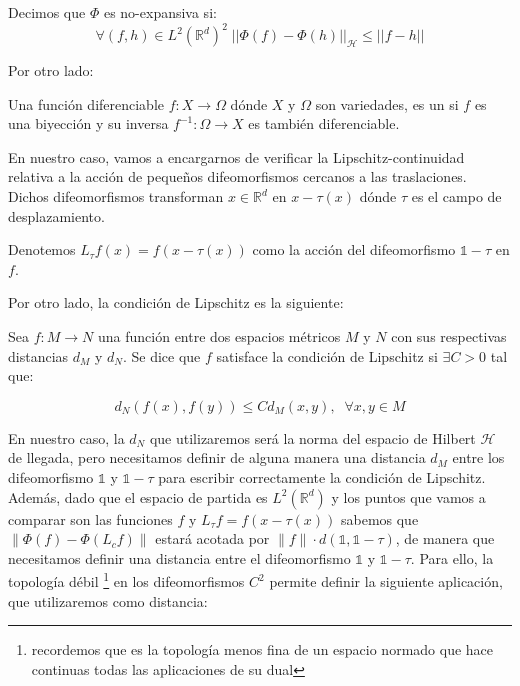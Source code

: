 \begin{definicion}
Decimos que $\Phi$ es no-expansiva si: 
$$\forall (f,h) \in L^2(\mathbb{R}^d)^2 \; || \Phi(f)-\Phi(h)||_\mathcal{H} \leq ||f-h||$$
\end{definicion}

\noindent Por otro lado: 


\begin{definicion}
  Una función diferenciable $f: X \rightarrow \Omega$ dónde $X$ y $\Omega$ son variedades, es un  si $f$ es una biyección y su inversa $f^{-1}:\Omega \rightarrow X$ es también diferenciable. 
\end{definicion}


\noindent En nuestro caso, vamos a encargarnos de verificar la Lipschitz-continuidad relativa a la acción de pequeños difeomorfismos cercanos a las traslaciones. Dichos difeomorfismos transforman $x \in \mathbb{R}^d$ en $x-\tau (x)$ dónde $\tau$ es el campo de desplazamiento. 

\begin{definicion}
Denotemos $L_{\tau} f(x)=f(x-\tau(x))$ como la acción del difeomorfismo $\mathbb{1}-\tau$ en $f$.
\end{definicion} 

\medskip

\noindent Por otro lado, la condición de Lipschitz es la siguiente: 

\begin{definicion}
  Sea $f: M \rightarrow N$ una función entre dos espacios métricos $M$ y $N$ con sus respectivas distancias $d_M$ y $d_N$. Se dice que $f$ satisface la condición de Lipschitz si $\exists C>0$ tal que: 

  $$d_N(f(x),f(y))\leq C d_M(x,y), \; \; \forall x,y \in M$$
\end{definicion}

\noindent En nuestro caso, la $d_N$ que utilizaremos será la norma del espacio de Hilbert $\mathcal{H}$ de llegada, pero necesitamos definir de alguna manera una distancia $d_M$ entre los difeomorfismo $\mathbb{1}$ y $\mathbb{1}-\tau$ para escribir correctamente la condición de Lipschitz. Además, dado que el espacio de partida es $L^2(\mathbb{R}^d)$ y los puntos que vamos a comparar son las funciones $f$ y $L_\tau f=f(x-\tau(x))$ sabemos que $\|\Phi(f) - \Phi(L_cf) \|$ estará acotada por $\|f\| · d(\mathbb{1}, \mathbb{1}-\tau)$, de manera que necesitamos definir una distancia entre el difeomorfismo $\mathbb{1}$ y $\mathbb{1}-\tau$. Para ello, la topología débil \footnote{ recordemos que es la topología menos fina de un espacio normado que hace continuas todas las aplicaciones de su dual} en los difeomorfismos $C^2$  permite definir la siguiente aplicación, que utilizaremos como distancia:

